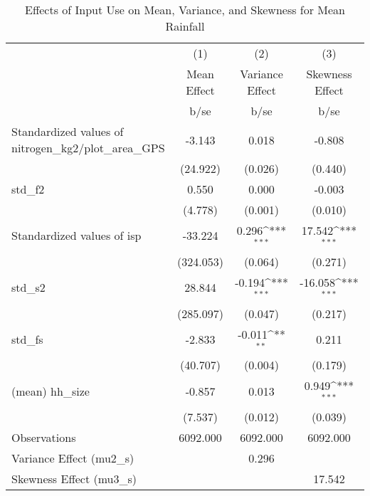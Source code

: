 \begin{table}[htbp]\centering
\def\sym#1{\ifmmode^{#1}\else\(^{#1}\)\fi}
\caption{Effects of Input Use on Mean, Variance, and Skewness for Mean Rainfall}
\begin{tabular}{l*{3}{c}}
\toprule
                &\multicolumn{1}{c}{(1)}&\multicolumn{1}{c}{(2)}&\multicolumn{1}{c}{(3)}\\
                &\multicolumn{1}{c}{Mean Effect}&\multicolumn{1}{c}{Variance Effect}&\multicolumn{1}{c}{Skewness Effect}\\
                &     b/se         &     b/se         &     b/se         \\
\midrule
Standardized values of nitrogen\_kg2/plot\_area\_GPS&   -3.143         &    0.018         &   -0.808         \\
                & (24.922)         &  (0.026)         &  (0.440)         \\
std\_f2          &    0.550         &    0.000         &   -0.003         \\
                &  (4.778)         &  (0.001)         &  (0.010)         \\
Standardized values of isp&  -33.224         &    0.296\sym{***}&   17.542\sym{***}\\
                &(324.053)         &  (0.064)         &  (0.271)         \\
std\_s2          &   28.844         &   -0.194\sym{***}&  -16.058\sym{***}\\
                &(285.097)         &  (0.047)         &  (0.217)         \\
std\_fs          &   -2.833         &   -0.011\sym{**} &    0.211         \\
                & (40.707)         &  (0.004)         &  (0.179)         \\
(mean) hh\_size  &   -0.857         &    0.013         &    0.949\sym{***}\\
                &  (7.537)         &  (0.012)         &  (0.039)         \\
\midrule
Observations    & 6092.000         & 6092.000         & 6092.000         \\
Variance Effect (mu2\_s)&                  &    0.296         &                  \\
Skewness Effect (mu3\_s)&                  &                  &   17.542         \\
\bottomrule
\end{tabular}
\end{table}
